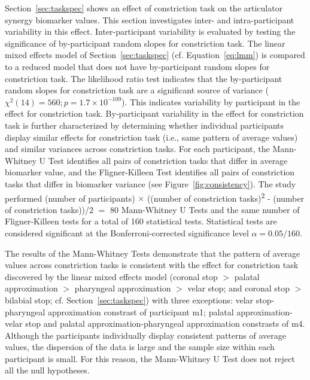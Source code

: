 \documentclass[preprint]{JASAnew}\usepackage[]{graphicx}\usepackage[]{color}
\begin{document}
Section~\ref{sec:taskspec} shows an effect of constriction task on the articulator synergy biomarker values. 
%
This section investigates inter- and intra-participant variability in this effect.
%
Inter-participant variability is evaluated by testing the significance of by-participant random slopes for constriction task.
%
The linear mixed effects model of Section~\ref{sec:taskspec} (cf. Equation~\ref{eq:lmm}) is compared to a reduced model that does not have by-participant random slopes for constriction task.
%
The likelihood ratio test indicates that the by-participant random slopes for constriction task are a significant source of variance ($\chi^2(14)= 560; p = \ensuremath{1.7\times 10^{-109}}$).
%
This indicates variability by participant in the effect for constriction task.
%
By-participant variability in the effect for constriction task is further characterized by determining whether individual participants display similar effects for constriction task (i.e., same pattern of average values) and similar variances across constriction tasks.
%
For each participant, the Mann-Whitney U Test identifies all pairs of constriction tasks that differ in average biomarker value,
and the Fligner-Killeen Test identifies all pairs of constriction tasks that differ in biomarker variance (see Figure~\ref{fig:consistency}).
%
The study performed (number of participants) $\times$ ((number of constriction tasks)\textsuperscript{2} - (number of constriction tasks))/2 $=$ \num{80} Mann-Whitney U Tests and the same number of Fligner-Killeen tests for a total of \num{160} statistical tests. 
%
Statistical tests are considered significant at the Bonferroni-corrected significance level $\alpha = 0.05/160$.


The results of the Mann-Whitney Tests demonstrate that the pattern of average values across constriction tasks is consistent with the effect for constriction task discovered by the linear mixed effects model (coronal stop $>$ palatal approximation $>$ pharyngeal approximation $>$ velar stop; and coronal stop $>$ bilabial stop; cf. Section~\ref{sec:taskspec}) with three exceptions: velar stop-pharyngeal approximation constrast of participant m1; palatal approximation-velar stop and palatal approximation-pharyngeal approximation constrasts of m4.
Although the participants individually display consistent patterns of average values, the dispersion of the data is large and the sample size within each participant is small.
For this reason, the Mann-Whitney U Test does not reject all the null hypotheses.
\end{document}
